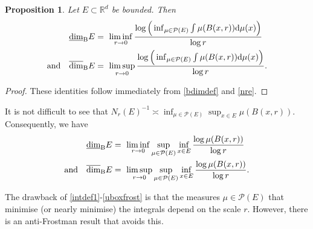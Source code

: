 \documentclass[12pt]{article}
\newcommand{\1}{{\bf 1}}
\newcommand\ubd{\overline{\mbox{\rm dim}}_{\rm B}} %
\newcommand\lbd{\underline{\mbox{\rm dim}}_{\rm B}} %
\newtheorem{prop}[theo]{Proposition}
\begin{document}
\begin{prop}\label{boxprop}
Let $E \subset \mathbb{R}^d$ be bounded. Then
\begin{align}
\lbd E &=\ \liminf_{r \rightarrow 0}\frac{\log\Big(\inf_{\mu \in \mathcal{P}(E)}\int 
\mu(B(x,r))\mathrm{d}\mu(x)\Big)}{ \log r}\label{intdef1}\\
\mbox{and} \quad 
\ubd E &=\ \limsup_{r \rightarrow 0}\frac{\log\Big(\inf_{\mu \in \mathcal{P}(E)}\int 
\mu(B(x,r))\mathrm{d}\mu(x)\Big)}{ \log r}.\label{intdef}
\end{align}
\end{prop}
\begin{proof}
These identities follow immediately from \eqref{bdimdef} and \eqref{nre}. 
\end{proof}
It is not difficult to see that $N_r(E)^{-1} \asymp\inf_{\mu\in\mathcal{P}(E)}\sup_{x\in E}\mu(B(x,r))$. Consequently, we have 
\begin{align}
	\lbd E &=\ \liminf_{r \rightarrow 0}\sup_{\mu \in \mathcal{P}(E)}\inf_{x\in E}\frac{\log  \mu(B(x,r))}{ \log r}\label{lboxfrost}\\
	\mbox{and} \quad 
	\ubd E &=\ \limsup_{r \rightarrow 0}\sup_{\mu \in \mathcal{P}(E)}\inf_{x\in E}\frac{\log  \mu(B(x,r))}{ \log r}.\label{uboxfrost}
\end{align}

The drawback of \eqref{intdef1}-\eqref{uboxfrost} is that the measures $\mu\in \mathcal{P}(E)$ that minimise (or nearly minimise) the integrals  depend on the scale $r$. 
However, there is an anti-Frostman result that avoids this.
\end{document}
